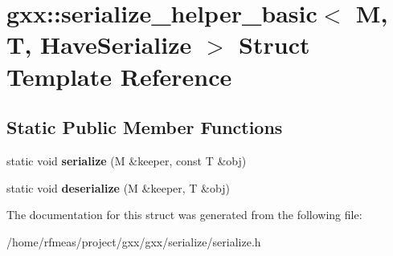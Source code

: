 \hypertarget{structgxx_1_1serialize__helper__basic}{}\section{gxx\+:\+:serialize\+\_\+helper\+\_\+basic$<$ M, T, Have\+Serialize $>$ Struct Template Reference}
\label{structgxx_1_1serialize__helper__basic}
\subsection*{Static Public Member Functions}
\begin{DoxyCompactItemize}
\item 
static void {\bfseries serialize} (M \&keeper, const T \&obj)\hypertarget{structgxx_1_1serialize__helper__basic_afbeb8e4dc2a7acf7b9f19027de8fd6f9}{}\label{structgxx_1_1serialize__helper__basic_afbeb8e4dc2a7acf7b9f19027de8fd6f9}

\item 
static void {\bfseries deserialize} (M \&keeper, T \&obj)\hypertarget{structgxx_1_1serialize__helper__basic_ac436e9e1746ea8146776a852b8583171}{}\label{structgxx_1_1serialize__helper__basic_ac436e9e1746ea8146776a852b8583171}

\end{DoxyCompactItemize}


The documentation for this struct was generated from the following file\+:\begin{DoxyCompactItemize}
\item 
/home/rfmeas/project/gxx/gxx/serialize/serialize.\+h\end{DoxyCompactItemize}
